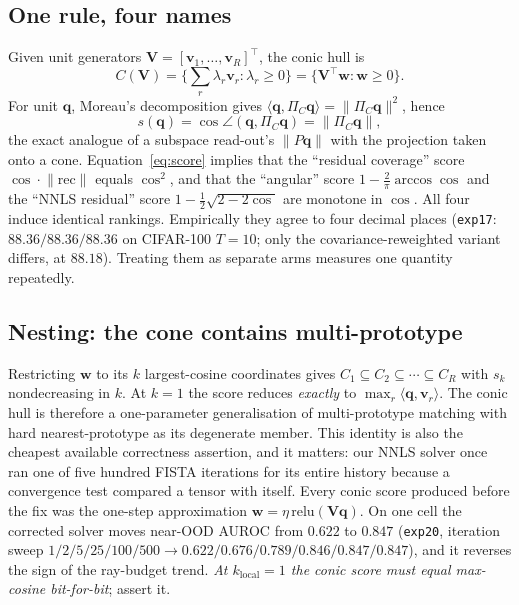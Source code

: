 \documentclass[10pt,twocolumn]{article}
\newcommand{\bq}{\mathbf{q}}
\newcommand{\bv}{\mathbf{v}}
\newcommand{\bw}{\mathbf{w}}
\newcommand{\bV}{\mathbf{V}}
\begin{document}
\subsection{One rule, four names}
Given unit generators $\bV=[\bv_1,\dots,\bv_R]^{\!\top}$, the conic hull is
\begin{equation}
C(\bV)=\Big\{\textstyle\sum_r\lambda_r\bv_r:\lambda_r\ge0\Big\}
      =\{\bV^{\!\top}\bw:\bw\ge0\}.
\end{equation}
For unit $\bq$, Moreau's decomposition gives
$\langle\bq,\Pi_C\bq\rangle=\lVert\Pi_C\bq\rVert^2$, hence
\begin{equation}
s(\bq)=\cos\angle(\bq,\Pi_C\bq)=\lVert\Pi_C\bq\rVert,
\label{eq:score}
\end{equation}
the exact analogue of a subspace read-out's $\lVert P\bq\rVert$ with the
projection taken onto a cone. Equation~\eqref{eq:score} implies that the
``residual coverage'' score $\cos\cdot\lVert\mathrm{rec}\rVert$ equals
$\cos^2$, and that the ``angular'' score $1-\tfrac{2}{\pi}\arccos\cos$ and the
``NNLS residual'' score $1-\tfrac12\sqrt{2-2\cos}$ are monotone in $\cos$. All
four induce identical rankings. Empirically they agree to four decimal places
(\texttt{exp17}: $88.36/88.36/88.36$ on CIFAR-100 $T{=}10$; only the
covariance-reweighted variant differs, at $88.18$). Treating them as separate
arms measures one quantity repeatedly.

\subsection{Nesting: the cone contains multi-prototype}
Restricting $\bw$ to its $k$ largest-cosine coordinates gives
$C_1\subseteq C_2\subseteq\cdots\subseteq C_R$ with $s_k$ nondecreasing in $k$.
At $k{=}1$ the score reduces \emph{exactly} to $\max_r\langle\bq,\bv_r\rangle$.
The conic hull is therefore a one-parameter generalisation of multi-prototype
matching with hard nearest-prototype as its degenerate member. This identity is
also the cheapest available correctness assertion, and it matters: our NNLS
solver once ran one of five hundred FISTA iterations for its entire history
because a convergence test compared a tensor with itself. Every conic score
produced before the fix was the one-step approximation
$\bw=\eta\,\mathrm{relu}(\bV\bq)$. On one cell the corrected solver moves
near-OOD AUROC from $0.622$ to $0.847$ (\texttt{exp20}, iteration sweep
$1/2/5/25/100/500 \to 0.622/0.676/0.789/0.846/0.847/0.847$), and it reverses the
sign of the ray-budget trend. \emph{At $k_{\text{local}}{=}1$ the conic score
must equal max-cosine bit-for-bit}; assert it.
\end{document}
